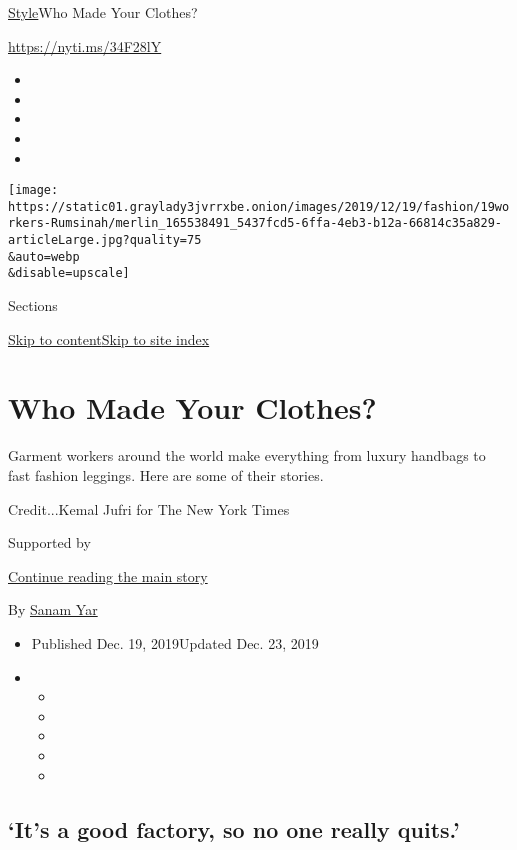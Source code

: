 \href{/section/style}{Style}\textbar{}Who Made Your Clothes?

\url{https://nyti.ms/34F28lY}

\begin{itemize}
\item
\item
\item
\item
\item
\end{itemize}

\texttt{[image: https://static01.graylady3jvrrxbe.onion/images/2019/12/19/fashion/19workers-Rumsinah/merlin\_165538491\_5437fcd5-6ffa-4eb3-b12a-66814c35a829-articleLarge.jpg?quality=75\\\&auto=webp\\\&disable=upscale]}

Sections

\protect\hyperlink{site-content}{Skip to
content}\protect\hyperlink{site-index}{Skip to site index}

\hypertarget{who-made-your-clothes}{%
\section{Who Made Your Clothes?}\label{who-made-your-clothes}}

Garment workers around the world make everything from luxury handbags to
fast fashion leggings. Here are some of their stories.

Credit...Kemal Jufri for The New York Times

Supported by

\protect\hyperlink{after-sponsor}{Continue reading the main story}

By \href{https://www.nytimes3xbfgragh.onion/by/sanam-yar}{Sanam Yar}

\begin{itemize}
\item
  Published Dec. 19, 2019Updated Dec. 23, 2019
\item
  \begin{itemize}
  \item
  \item
  \item
  \item
  \item
  \end{itemize}
\end{itemize}

\hypertarget{its-a-good-factory-so-no-one-really-quits}{%
\subsection{`It's a good factory, so no one really
quits.'}\label{its-a-good-factory-so-no-one-really-quits}}

